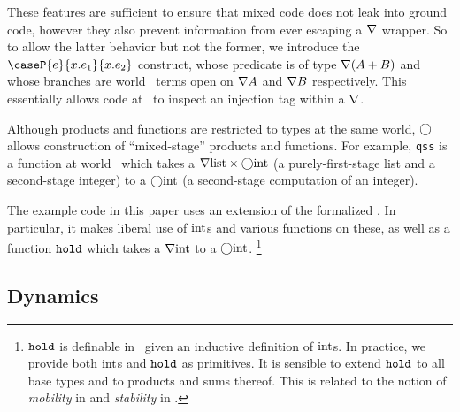 \begin{abstrsyn}
These features are sufficient to ensure that mixed code does not leak into ground code,
however they also prevent information from ever escaping a $\nabla$ wrapper.
So to allow the latter behavior but not the former, we introduce the $\caseP{e}{x.e_1}{x.e_2}$ construct, 
whose predicate is of type $\nabla(A+B)$ and
whose branches are world \bbonem\ terms open on $\nabla{A}$ and $\nabla{B}$ respectively. 
This essentially allows code at \bbonem\ to inspect an injection tag within a $\nabla$.

Although products and functions are restricted to types at the same world,
$\bigcirc$ allows construction of ``mixed-stage'' products and functions.
For example, \texttt{qss} is a function at world \bbonem\ which takes a
$\nabla{\rm list} \times \bigcirc{\rm int}$ (a purely-first-stage list and a
second-stage integer) to a $\bigcirc{\rm int}$ (a second-stage
computation of an integer).

The example code in this paper uses an extension of the formalized \lang.
In particular, it makes liberal use of ${\rm int}$s and various
functions on these, as well as a function ${\tt hold}$ which takes a $\nabla{\rm int}$
to a $\bigcirc{\rm int}$.%
\footnote{${\tt hold}$ is definable in \lang\ given an inductive definition of
${\rm int}$s. In practice, we provide both ${\rm int}$s and ${\tt hold}$ as primitives.
It is sensible to extend ${\tt hold}$ to all base types and to products and sums
thereof. This is related to the notion of {\em mobility} in \cite{murphy05} and
{\em stability} in \cite{krishnaswami13}.}

\end{abstrsyn}


\subsection{Dynamics}
\label{sec:dynamics}

